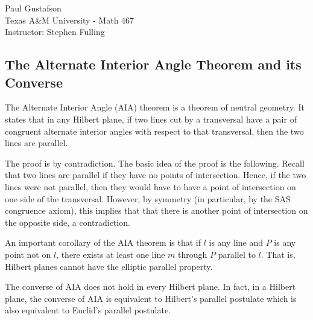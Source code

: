 \documentclass{article}
\begin{document}
\noindent Paul Gustafson\\
\noindent Texas A\&M University - Math 467\\ 
\noindent Instructor: Stephen Fulling

\subsection*{The Alternate Interior Angle Theorem and its Converse}
The Alternate Interior Angle (AIA) theorem is a theorem of neutral geometry.  It states that in any Hilbert plane, if two lines cut by a transversal have a pair of congruent alternate interior angles with respect to that transversal, then the two lines are parallel.  

The proof is by contradiction. The basic idea of the proof is the following.   Recall that two lines are parallel if they have no points of intersection.   Hence, if the two lines were not parallel, then they would have to have a point of intersection on one side of the transversal.  However, by symmetry (in particular, by the SAS congruence axiom), this implies that that there is another point of intersection on the opposite side, a contradiction.

An important corollary of the AIA theorem is that if $l$ is any line and $P$ is any point not on $l$, there exists at least one line $m$ through $P$ parallel to $l$.  That is, Hilbert planes cannot have the elliptic parallel property.

The converse of AIA does not hold in every Hilbert plane.  In fact, in a Hilbert plane, the converse of AIA is equivalent to Hilbert's parallel postulate which is also equivalent to Euclid's parallel postulate.
\end{document}
